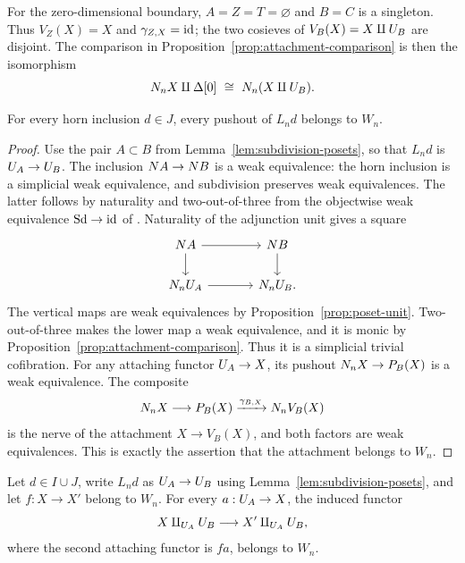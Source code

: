 \begin{remark}
For the zero-dimensional boundary, $A=Z=T=\varnothing$ and $B=C$
is a singleton.  Thus $V_Z(X)=X$ and $\gamma_{Z,X}=\mathrm{id}$; the two
cosieves of $V_B(X)=X\amalg U_{B}$ are disjoint.  The comparison in
Proposition~\ref{prop:attachment-comparison} is then the isomorphism
\[
 N_n X\amalg\Delta[0]\ \cong\ N_n(X\amalg U_{B}).
\]
\end{remark}

\begin{corollary}
\label{cor:horn-acyclic}
For every horn inclusion $d\in J$, every pushout of $L_n d$ belongs
to $W_n$.
\end{corollary}

\begin{proof}
Use the pair $A\subset B$ from Lemma~\ref{lem:subdivision-posets},
so that $L_n d$ is $U_{A}\to U_{B}$.
The inclusion $N A\to N B$ is a weak equivalence: the horn
inclusion is a simplicial weak equivalence, and subdivision preserves
weak equivalences.  The latter follows by naturality and
two-out-of-three from the objectwise weak equivalence
$\mathrm{Sd}\to\mathrm{id}$ of \cite[Theorem~4.5]{AraMaltsiniotis2014}.
Naturality of the adjunction unit gives a square
\[
 \begin{tikzcd}[column sep=large]
 \OrdN A \arrow[r] \arrow[d] & \OrdN B \arrow[d]\\
 \Street\U{A} \arrow[r] & \Street\U{B}.
 \end{tikzcd}
\]
The vertical maps are weak equivalences by
Proposition~\ref{prop:poset-unit}.  Two-out-of-three makes the lower
map a weak equivalence, and it is monic by
Proposition~\ref{prop:attachment-comparison}.  Thus it is a
simplicial trivial cofibration.  For any attaching functor
$U_{A}\to X$, its pushout $N_n X\to P_B(X)$ is a weak
equivalence.  The composite
\[
 N_n X\longrightarrow P_B(X)
   \xrightarrow{\gamma_{B,X}}N_n V_B(X)
\]
is the nerve of the attachment $X\to V_B(X)$, and both factors are
weak equivalences.  This is exactly the assertion that the
attachment belongs to $W_n$.
\end{proof}

\begin{corollary}
\label{cor:attachment-invariance}
Let $d\in I\cup J$, write $L_n d$ as $U_{A}\to U_{B}$ using
Lemma~\ref{lem:subdivision-posets}, and let $f:X\to X'$ belong to
$W_n$.  For every $a:U_{A}\to X$, the induced functor
\[
 X\amalg_{U_{A}}U_{B}
 \longrightarrow X'\amalg_{U_{A}}U_{B},
\]
where the second attaching functor is $fa$, belongs to $W_n$.
\end{corollary}

